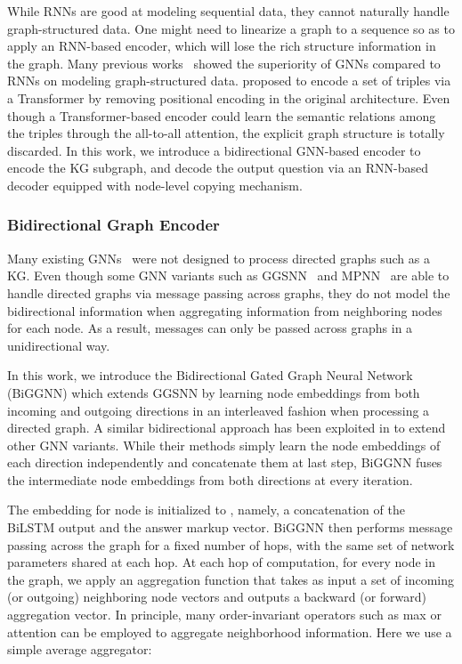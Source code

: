 \documentclass[journal]{IEEEtran}
\begin{document}
While RNNs are good at modeling sequential data, they cannot naturally handle graph-structured data.
One might need to linearize a graph to a sequence so as to apply an RNN-based encoder, which will lose the rich structure information in the graph.
Many previous works~\cite{bastings2017graph,beck2018graph} showed the superiority of GNNs compared to RNNs on modeling graph-structured data. 
\cite{kumar2019difficulty} proposed to encode a set of triples via a Transformer by removing positional encoding in the original architecture.
Even though a Transformer-based encoder could learn the semantic relations among the triples through the all-to-all attention,
the explicit graph structure is totally discarded.
In this work, we introduce a 
bidirectional GNN-based encoder to encode the KG subgraph, and decode the output question via an RNN-based decoder equipped with node-level copying mechanism.





\subsubsection{Bidirectional Graph Encoder}


Many existing GNNs~\cite{kipf2016semi,hamilton2017inductive,velivckovic2017graph} were not designed to process directed graphs such as a KG.
Even though some GNN variants such as GGSNN~\cite{li2015gated} and MPNN~\cite{gilmer2017neural} are able to handle directed graphs via message passing across graphs, 
they do not model the bidirectional information when aggregating information from neighboring nodes for each node.
As a result, messages can only be passed across graphs in a unidirectional way.


In this work, we introduce the Bidirectional Gated Graph Neural Network (BiGGNN) which extends GGSNN
by learning node embeddings from both incoming and outgoing directions in an interleaved fashion when processing a directed graph.
A similar bidirectional approach has been exploited in \cite{xu2018graph2seq,ribeiro2019enhancing} to extend other GNN variants. 
While their methods simply learn the node embeddings of each direction independently and concatenate them at last step,
BiGGNN fuses the intermediate node embeddings from both directions at every iteration.





The embedding  for node  is initialized to , namely, a concatenation of the BiLSTM output and the answer markup vector. 
BiGGNN then performs message passing across the graph for a fixed number of hops, with the same set of network parameters shared at each hop.
At each hop of computation, for every node in the graph, we apply an aggregation function that takes as input a set of incoming (or outgoing) neighboring node vectors and outputs a backward (or forward) aggregation vector.
In principle, many order-invariant operators such as max or attention \cite{velivckovic2017graph} can be employed to aggregate neighborhood information.
Here we use a simple average aggregator:
\end{document}
